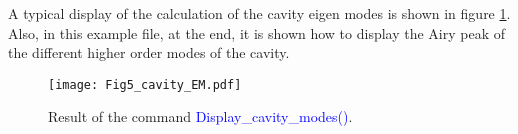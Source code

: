 A typical display of the calculation of the cavity eigen modes is shown in figure \ref{fig5:cav_EM}.  Also, in this example file, at the end, it is shown how to display the Airy peak of the different higher order modes of the cavity.

\begin{figure}
\begin{center}
\texttt{[image: Fig5\_cavity\_EM.pdf]}\hfill
\end{center}
\caption{\label{fig5:cav_EM} Result of the command \textcolor{blue}{Display\_cavity\_modes()}.}
\end{figure}

